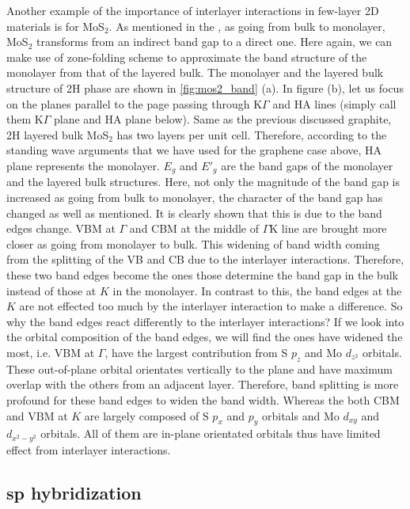 Another example of the importance of interlayer interactions in few-layer 2D materials is for MoS$_2$. As mentioned in the , as going from bulk to monolayer, MoS$_2$ transforms from an indirect band gap to a direct one. Here again, we can make use of zone-folding scheme to approximate the band structure of the monolayer from that of the layered bulk. The monolayer and the layered bulk structure of 2H phase are shown in \autoref{fig:mos2_band} (a). In figure (b), let us focus on the planes parallel to the page passing through K$\Gamma$ and HA lines (simply call them K$\Gamma$ plane and HA plane below). Same as the previous discussed graphite, 2H layered bulk MoS$_2$ has two layers per unit cell. Therefore, according to the standing wave arguments that we have used for the graphene case above, HA plane represents the monolayer. $E_g$ and $E\prime_g$ are the band gaps of the monolayer and the layered bulk structures. Here, not only the magnitude of the band gap is increased as going from bulk to monolayer, the character of the band gap has changed as well as mentioned. It is clearly shown that this is due to the band edges change. VBM at $\Gamma$ and CBM at the middle of $\Gamma$K line are brought more closer as going from monolayer to bulk. This widening of band width coming from the splitting of the VB and CB due to the interlayer interactions. Therefore, these two band edges become the ones those determine the band gap in the bulk instead of those at $K$ in the monolayer. In contrast to this, the band edges at the $K$ are not effected too much by the interlayer interaction to make a difference. So why the band edges react differently to the interlayer interactions? If we look into the orbital composition of the band edges, we will find the ones have widened the most, i.e. VBM at $\Gamma$, have the largest contribution from S $p_z$ and Mo $d_{z^2}$ orbitals. These out-of-plane orbital orientates vertically to the plane and have maximum overlap with the others from an adjacent layer. Therefore, band splitting is more profound for these band edges to widen the band width. Whereas the both CBM and VBM at $K$ are largely composed of S $p_x$ and $p_y$ orbitals and Mo $d_{xy}$ and $d_{x^2-y^2}$ orbitals. All of them are in-plane orientated orbitals thus have limited effect from interlayer interactions\cite{Padilha2014}.



\subsection{sp hybridization}


